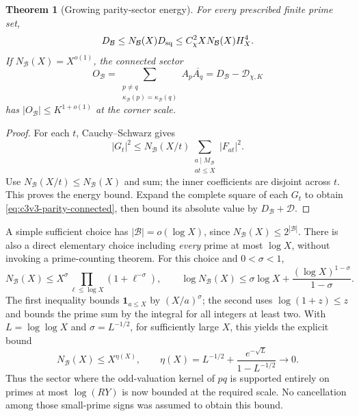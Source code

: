 \documentclass[11pt]{article}
\newtheorem{theorem}{Theorem}[section]
\theoremstyle{remark}
\begin{document}
\begin{theorem}[Growing parity-sector energy]
\label{thm:c3v3-parity-sector}
For every prescribed finite prime set,
\begin{equation}
 D_{\mathcal B}\le N_{\mathcal B}(X)D_{\rm sq}
                     \le C_\chi^2XN_{\mathcal B}(X)H_X^4.
 \label{eq:c3v3-parity-energy}
\end{equation}
If \(N_{\mathcal B}(X)=X^{o(1)}\), the connected sector
\begin{equation}
 O_{\mathcal B}=
    \sum_{\substack{p\ne q\\\kappa_{\mathcal B}(p)=\kappa_{\mathcal B}(q)}}
             A_p\overline{A_q}
      =D_{\mathcal B}-\mathcal D_{\chi,K}
 \label{eq:c3v3-parity-connected}
\end{equation}
has \(|O_{\mathcal B}|\le K^{1+o(1)}\) at the corner scale.
\end{theorem}

\begin{proof}
For each \(t\), Cauchy--Schwarz gives
\[
 |G_t|^2\le N_{\mathcal B}(X/t)
       \sum_{\substack{a\mid M_{\mathcal B}\\at\le X}}|F_{at}|^2.
\]
Use \(N_{\mathcal B}(X/t)\le N_{\mathcal B}(X)\) and sum;
the inner coefficients are disjoint across \(t\).  This proves
the energy bound.  Expand the complete square of each \(G_t\)
to obtain \eqref{eq:c3v3-parity-connected}, then bound its absolute
value by \(D_{\mathcal B}+\mathcal D\).
\end{proof}

A simple sufficient choice has \(|\mathcal B|=o(\log X)\), since
\(N_{\mathcal B}(X)\le2^{|\mathcal B|}\).  There is also a direct
elementary choice including \emph{every} prime at most \(\log X\),
without invoking a prime-counting theorem.  For this choice and
\(0<\sigma<1\),
\[
 N_{\mathcal B}(X)
 \le X^\sigma\prod_{\ell\le\log X}(1+\ell^{-\sigma}),\qquad
 \log N_{\mathcal B}(X)
 \le\sigma\log X+\frac{(\log X)^{1-\sigma}}{1-\sigma}.
\]
The first inequality bounds \(\mathbf1_{a\le X}\) by
\((X/a)^\sigma\); the second uses \(\log(1+z)\le z\)
and bounds the prime sum by the integral for all integers at least two.
With \(L=\log\log X\) and \(\sigma=L^{-1/2}\), for sufficiently
large \(X\), this yields the explicit bound
\begin{equation}
 N_{\mathcal B}(X)\le X^{\eta(X)},\qquad
 \eta(X)=L^{-1/2}+\frac{e^{-\sqrt L}}{1-L^{-1/2}}
                       \longrightarrow0.
 \label{eq:c3v3-log-primes}
\end{equation}
Thus the sector where the odd-valuation kernel of \(pq\) is supported
entirely on primes at most \(\log(RY)\) is now bounded at the
required scale.  No cancellation among those small-prime signs was
assumed to obtain this bound.
\end{document}
